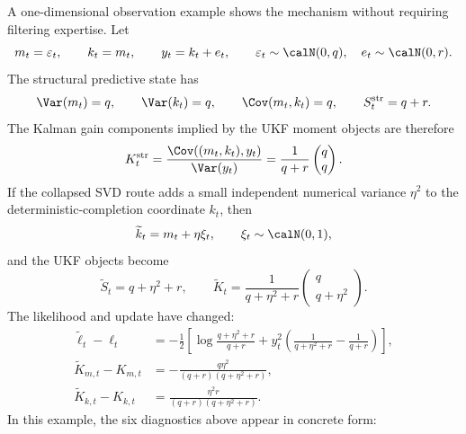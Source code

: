 A one-dimensional observation example shows the mechanism without requiring
filtering expertise.  Let
\begin{equation}
  m_t=\varepsilon_t,\qquad k_t=m_t,\qquad
  y_t=k_t+e_t,\qquad
  \varepsilon_t\sim\calN(0,q),\quad e_t\sim\calN(0,r).
\end{equation}
The structural predictive state has
\[
  \Var(m_t)=q,\qquad
  \Var(k_t)=q,\qquad
  \Cov(m_t,k_t)=q,
  \qquad
  S_t^{\mathrm{str}}=q+r.
\]
The Kalman gain components implied by the UKF moment objects are therefore
\[
  K_t^{\mathrm{str}}
  =
  \frac{\Cov((m_t,k_t),y_t)}{\Var(y_t)}
  =
  \frac{1}{q+r}
  \begin{pmatrix}q\\ q\end{pmatrix}.
  \label{eq:bf-structural-gain-identity-example}
\]
If the collapsed SVD route adds a small independent numerical variance
$\eta^2$ to the deterministic-completion coordinate $k_t$, then
\begin{equation}
  \widetilde k_t=m_t+\eta\xi_t,\qquad
  \xi_t\sim\calN(0,1),
\end{equation}
and the UKF objects become
\[
  \widetilde S_t=q+\eta^2+r,\qquad
  \widetilde K_t
  =
  \frac{1}{q+\eta^2+r}
  \begin{pmatrix}q\\ q+\eta^2\end{pmatrix}.
  \label{eq:bf-collapsed-gain-identity-example}
\]
The likelihood and update have changed:
\begin{align}
  \widetilde\ell_t-\ell_t
  &=
  -\frac12
  \left[
    \log\frac{q+\eta^2+r}{q+r}
    +
    y_t^2
    \left(\frac{1}{q+\eta^2+r}-\frac{1}{q+r}\right)
  \right],\\
  \widetilde K_{m,t}-K_{m,t}
  &=
  -\frac{q\eta^2}{(q+r)(q+\eta^2+r)},\\
  \widetilde K_{k,t}-K_{k,t}
  &=
  \frac{\eta^2 r}{(q+r)(q+\eta^2+r)} .
  \label{eq:bf-collapsed-ukf-likelihood-gain-change}
\end{align}
In this example, the six diagnostics above appear in concrete form:

